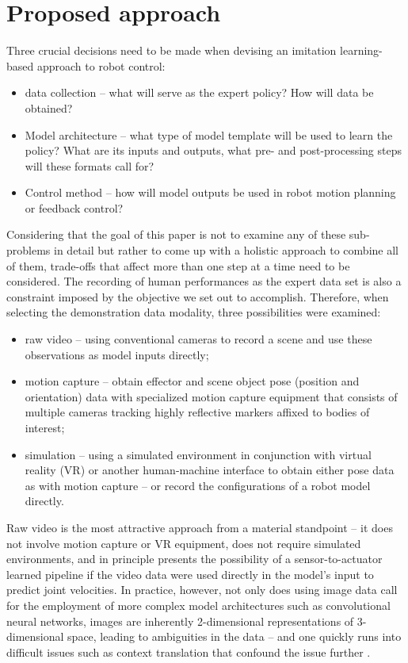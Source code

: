 \documentclass{article}
\begin{document}
\section{Proposed approach}
\label{sec:approach}

Three crucial decisions need to be made when devising an imitation learning-based approach to robot control:
\begin{itemize}
	\item data collection -- what will serve as the expert policy? How will data be obtained?
	\item Model architecture -- what type of model template will be used to learn the policy? What are its inputs and outputs, what pre- and post-processing steps will these formats call for?
	\item Control method -- how will model outputs be used in robot motion planning or feedback control?
\end{itemize}

Considering that the goal of this paper is not to examine any of these sub-problems in detail but rather to come up with a holistic approach to combine all of them, trade-offs that affect more than one step at a time need to be considered. The recording of human performances as the expert data set is also a constraint imposed by the objective we set out to accomplish. Therefore, when selecting the demonstration data modality, three possibilities were examined:
\begin{itemize}
	\item raw video -- using conventional cameras to record a scene and use these observations as model inputs directly;
	\item motion capture -- obtain effector and scene object pose (position and orientation) data with specialized motion capture equipment that consists of multiple cameras tracking highly reflective markers affixed to bodies of interest;
	\item simulation -- using a simulated environment in conjunction with virtual reality (VR) or another human-machine interface to obtain either pose data as with motion capture -- or record the configurations of a robot model directly. 
\end{itemize}

Raw video is the most attractive approach from a material standpoint -- it does not involve motion capture or VR equipment, does not require simulated environments, and in principle presents the possibility of a sensor-to-actuator learned pipeline if the video data were used directly in the model's input to predict joint velocities. In practice, however, not only does using image data call for the employment of more complex model architectures such as convolutional neural networks, images are inherently 2-dimensional representations of 3-dimensional space, leading to ambiguities in the data -- and one quickly runs into difficult issues such as context translation that confound the issue further \citep{liu2018imitation}. 
\end{document}
